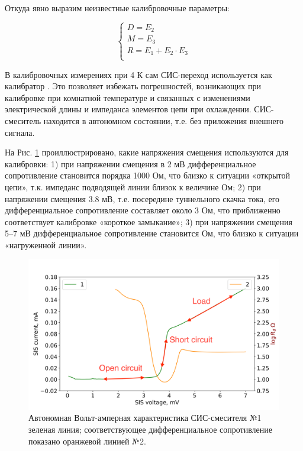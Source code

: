 \documentclass[a4paper]{article}
\begin{document}
Откуда явно выразим неизвестные калибровочные параметры:

\begin{equation}
    \begin{cases}
        D = E_2 \\
        M = E_3 \\
        R = E_1 + E_2 \cdot E_3 \\
    \end{cases}
\end{equation}

В калибровочных измерениях при 4 К сам СИС-переход используется как калибратор \cite{Serres}. Это позволяет избежать погрешностей, возникающих при калибровке при 
комнатной температуре и связанных с изменениями электрической длины и импеданса элементов цепи при охлаждении. СИС-смеситель находится в автономном 
состоянии, т.е. без приложения внешнего сигнала. 

На Рис. \ref{pic-cal} проиллюстрировано, какие напряжения смещения используются для калибровки:  1) при напряжении смещения в 2 мВ  дифференциальное сопротивление 
становится порядка 1000 Ом, что близко к ситуации «открытой цепи», т.к. импеданс подводящей линии близок к величине  Ом; 2) при напряжении смещения 3.8 мВ, 
т.е. посередине туннельного скачка тока, его дифференциальное сопротивление составляет около 3 Ом, что приближенно соответствует калибровке «короткое замыкание»; 
3) при напряжении смещения 5–7 мВ дифференциальное сопротивление становится  Ом, что близко к ситуации «нагруженной линии». 

\begin{figure}[H]
    \begin{center}
        \includegraphics[scale=0.5]{cal.png}
        \caption{Автономная Вольт-амперная характеристика СИС-смесителя №1 зеленая линия; соответствующее дифференциальное сопротивление показано оранжевой линией №2.}
        \label{pic-cal}
    \end{center}
\end{figure}
\end{document}
